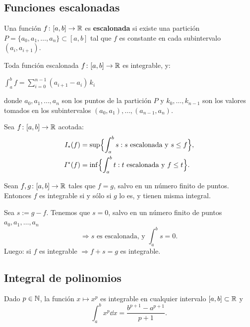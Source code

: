 \documentclass[11pt,a4paper]{article}
\begin{document}
\subsection{Funciones escalonadas}

\begin{definicion}
Una función $f\colon[a,b]\to\mathbb{R}$ es \textbf{escalonada} si existe una partición
$P=\{a_0,a_1,\dots,a_n\}\subset[a,b]$ tal que $f$ es constante en cada subintervalo $(a_i,a_{i+1})$.
\end{definicion}

\begin{proposicion}
Toda función escalonada $f\colon[a,b]\to\mathbb{R}$ es integrable, y:
\begin{center}
$\displaystyle\int_a^b f=\sum_{i=0}^{n-1}(a_{i+1}-a_i)\,k_i$
\end{center}
donde $a_0,a_1,\dots,a_n$ son los puntos de la partición $P$ y $k_0,\dots,k_{n-1}$ son los valores tomados en los subintervalos $(a_0,a_1),\dots,(a_{n-1},a_n)$.
\end{proposicion}

\begin{ejercicio}
Sea $f\colon[a,b]\to\mathbb{R}$ acotada:
\begin{align*}
  I_*(f)&=\sup\Bigl\{\int_a^b s : s \text{ escalonada y } s\le f\Bigr\},\\
  I^*(f)&=\inf\Bigl\{\int_a^b t : t \text{ escalonada y } f\le t\Bigr\}.
\end{align*}
\end{ejercicio}

\begin{proposicion}
Sean $f,g\colon[a,b]\to\mathbb{R}$ tales que $f=g$, salvo en un número finito de puntos. Entonces $f$ es integrable si y sólo si $g$ lo es, y tienen misma integral.
\end{proposicion}

\begin{demo}
Sea $s:=g-f$. Tenemos que $s=0$, salvo en un número finito de puntos $a_0,a_1,\dots,a_n$
\[
  \Rightarrow s \text{ es escalonada, y } \int_a^b s=0.
\]
Luego: si $f$ es integrable $\Rightarrow f+s=g$ es integrable.
\end{demo}

\subsection{Integral de polinomios}

\begin{proposicion}
Dado $p\in\mathbb{N}$, la función $x\mapsto x^p$ es integrable en cualquier intervalo $[a,b]\subset\mathbb{R}$ y
\[
  \int_a^b x^p\dd x=\frac{b^{p+1}-a^{p+1}}{p+1}.
\]
\end{proposicion}
\end{document}

